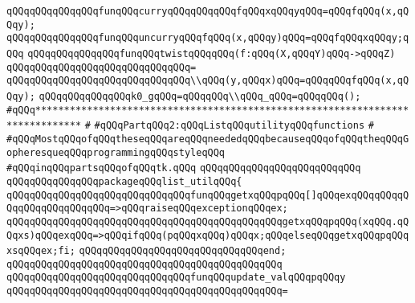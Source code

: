 \newline
\verb|qQQqqQQqqQQqqQQqfunqQQqcurryqQQqqQQqqQQqfqQQqxqQQqyqQQq=qQQqfqQQq(x,qQQqy);|\newline
\verb|qQQqqQQqqQQqqQQqfunqQQquncurryqQQqfqQQq(x,qQQqy)qQQq=qQQqfqQQqxqQQqy;qQQq|\newline
\newline
\verb|qQQqqQQqqQQqqQQqfunqQQqtwistqQQqqQQq(f:qQQq(X,qQQqY)qQQq->qQQqZ)|\newline
\verb|qQQqqQQqqQQqqQQqqQQqqQQqqQQqqQQq=|\newline
\verb|qQQqqQQqqQQqqQQqqQQqqQQqqQQqqQQq\\qQQq(y,qQQqx)qQQq=qQQqqQQqfqQQq(x,qQQqy);|\newline
\newline
\verb|qQQqqQQqqQQqqQQqk0_gqQQq=qQQqqQQq\\qQQq_qQQq=qQQqqQQq();|\newline
\newline
\verb|#qQQq******************************************************************************|\newline
\verb|#|\newline
\verb|#qQQqPartqQQq2:qQQqListqQQqutilityqQQqfunctions|\newline
\verb|#|\newline
\verb|#qQQqMostqQQqofqQQqtheseqQQqareqQQqneededqQQqbecauseqQQqofqQQqtheqQQqGopheresqueqQQqprogrammingqQQqstyleqQQq|\newline
\verb|#qQQqinqQQqpartsqQQqofqQQqtk.qQQq|\newline
\newline
\verb|qQQqqQQqqQQqqQQqqQQqqQQqqQQq|\newline
\verb|qQQqqQQqqQQqqQQqpackageqQQqlist_utilqQQq{|\newline
\newline
\verb|qQQqqQQqqQQqqQQqqQQqqQQqqQQqqQQqfunqQQqgetxqQQqpqQQq[]qQQqexqQQqqQQqqQQqqQQqqQQqqQQqqQQq=>qQQqraiseqQQqexceptionqQQqex;|\newline
\verb|qQQqqQQqqQQqqQQqqQQqqQQqqQQqqQQqqQQqqQQqqQQqqQQqgetxqQQqpqQQq(xqQQq.qQQqxs)qQQqexqQQq=>qQQqifqQQq(pqQQqxqQQq)qQQqx;qQQqelseqQQqgetxqQQqpqQQqxsqQQqex;fi;|\newline
\verb|qQQqqQQqqQQqqQQqqQQqqQQqqQQqqQQqend;|\newline
\verb|qQQqqQQqqQQqqQQqqQQqqQQqqQQqqQQqqQQqqQQqqQQqqQQq|\newline
\verb|qQQqqQQqqQQqqQQqqQQqqQQqqQQqqQQqfunqQQqupdate_valqQQqpqQQqy|\newline
\verb|qQQqqQQqqQQqqQQqqQQqqQQqqQQqqQQqqQQqqQQqqQQqqQQq=|\newline
